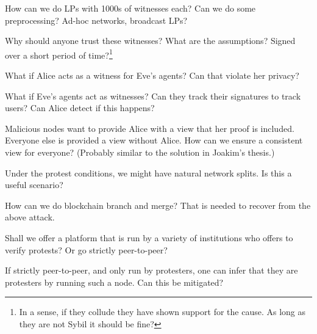 \begin{frame}
\begin{question}
  How can we do \acp{LP} with 1000s of witnesses each?
  Can we do some preprocessing?
  Ad-hoc networks, broadcast \acp{LP}?
\end{question}
\end{frame}

\begin{frame}
\begin{question}
  Why should anyone trust these witnesses?
  What are the assumptions?
  Signed over a short period of time?\footnote{%
    In a sense, if they collude they have shown support for the cause.
    As long as they are not Sybil it should be fine?
  }
\end{question}

\pause

\begin{question}
  What if Alice acts as a witness for Eve's agents?
  Can that violate her privacy?
\end{question}

\pause

\begin{question}
  What if Eve's agents act as witnesses?
  Can they track their signatures to track users?
  Can Alice detect if this happens?
\end{question}
\end{frame}

\begin{frame}
  \begin{question}
    Malicious nodes want to provide Alice with a view that her proof is 
    included.
    Everyone else is provided a view without Alice.
    How can we ensure a consistent view for everyone?
    (Probably similar to the solution in Joakim's thesis.)
  \end{question}

  \begin{question}
    Under the protest conditions, we might have natural network splits.
    Is this a useful scenario?
  \end{question}

  \begin{question}
    How can we do blockchain branch and merge?
    That is needed to recover from the above attack.
  \end{question}
\end{frame}

\begin{frame}
  \begin{question}
    Shall we offer a platform that is run by a variety of institutions who 
    offers to verify protests?
    Or go strictly peer-to-peer?
  \end{question}
  \begin{question}
    If strictly peer-to-peer, and only run by protesters, one can infer that 
    they are protesters by running such a node.
    Can this be mitigated?
  \end{question}
\end{frame}

